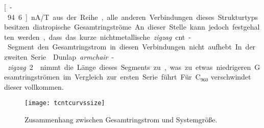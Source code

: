 \unit[-94.6]{nA/T} aus der Reihe, alle anderen Verbindungen dieses Strukturtyps besitzen diatropische Gesamtringströme. An dieser Stelle kann jedoch festgehalten werden, dass das kurze nichtmetallische \textit{zigzag} \ac{cnt}-Segment den Gesamtringstrom in diesen Verbindungen nicht aufhebt. In der zweiten Serie \glqq Dunlap \textit{armchair}-\textit{zigzag} 2\grqq{} nimmt die Länge dieses Segments zu, was zu etwas niedrigeren Gesamtringströmen im Vergleich zur ersten Serie führt. Für C$_{960}$ verschwindet dieser vollkommen. \\

\begin{figure}[ht!]
	\centering
	\texttt{[image: tcntcurvssize]}
	\captionsetup{figurewithin = chapter}
	\captionsetup{font=small, labelfont=bf}\caption[Zusammenhang zwischen Gesamtringstrom und Systemgröße]{Zusammenhang zwischen Gesamtringstrom und Systemgröße.}
\label{abb:tcntcurvssize}
\end{figure}

